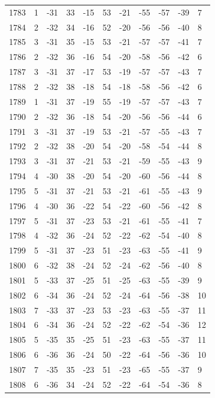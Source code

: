 \begin{table}[H]
\begin{tabular}{lllllllllll}
1783 & 1 & -31 & 33 & -15 & 53 & -21 & -55 & -57 & -39 & 7 \\
1784 & 2 & -32 & 34 & -16 & 52 & -20 & -56 & -56 & -40 & 8 \\
1785 & 3 & -31 & 35 & -15 & 53 & -21 & -57 & -57 & -41 & 7 \\
1786 & 2 & -32 & 36 & -16 & 54 & -20 & -58 & -56 & -42 & 6 \\
1787 & 3 & -31 & 37 & -17 & 53 & -19 & -57 & -57 & -43 & 7 \\
1788 & 2 & -32 & 38 & -18 & 54 & -18 & -58 & -56 & -42 & 6 \\
1789 & 1 & -31 & 37 & -19 & 55 & -19 & -57 & -57 & -43 & 7 \\
1790 & 2 & -32 & 36 & -18 & 54 & -20 & -56 & -56 & -44 & 6 \\
1791 & 3 & -31 & 37 & -19 & 53 & -21 & -57 & -55 & -43 & 7 \\
1792 & 2 & -32 & 38 & -20 & 54 & -20 & -58 & -54 & -44 & 8 \\
1793 & 3 & -31 & 37 & -21 & 53 & -21 & -59 & -55 & -43 & 9 \\
1794 & 4 & -30 & 38 & -20 & 54 & -20 & -60 & -56 & -44 & 8 \\
1795 & 5 & -31 & 37 & -21 & 53 & -21 & -61 & -55 & -43 & 9 \\
1796 & 4 & -30 & 36 & -22 & 54 & -22 & -60 & -56 & -42 & 8 \\
1797 & 5 & -31 & 37 & -23 & 53 & -21 & -61 & -55 & -41 & 7 \\
1798 & 4 & -32 & 36 & -24 & 52 & -22 & -62 & -54 & -40 & 8 \\
1799 & 5 & -31 & 37 & -23 & 51 & -23 & -63 & -55 & -41 & 9 \\
1800 & 6 & -32 & 38 & -24 & 52 & -24 & -62 & -56 & -40 & 8 \\
1801 & 5 & -33 & 37 & -25 & 51 & -25 & -63 & -55 & -39 & 9 \\
1802 & 6 & -34 & 36 & -24 & 52 & -24 & -64 & -56 & -38 & 10 \\
1803 & 7 & -33 & 37 & -23 & 53 & -23 & -63 & -55 & -37 & 11 \\
1804 & 6 & -34 & 36 & -24 & 52 & -22 & -62 & -54 & -36 & 12 \\
1805 & 5 & -35 & 35 & -25 & 51 & -23 & -63 & -55 & -37 & 11 \\
1806 & 6 & -36 & 36 & -24 & 50 & -22 & -64 & -56 & -36 & 10 \\
1807 & 7 & -35 & 35 & -23 & 51 & -23 & -65 & -55 & -37 & 9 \\
1808 & 6 & -36 & 34 & -24 & 52 & -22 & -64 & -54 & -36 & 8 \\

\end{tabular}
\end{table}
